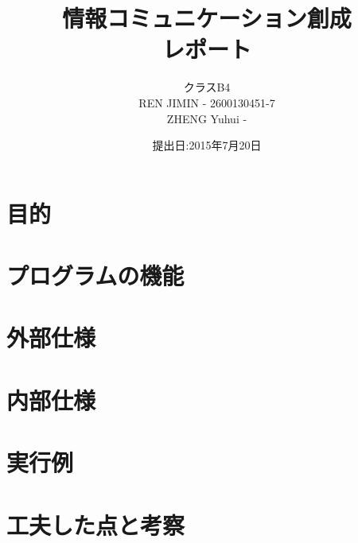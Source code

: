 \documentclass{jarticle}
\title{情報コミュニケーション創成\\レポート}
\author{クラスB4\\REN JIMIN - 2600130451-7\\ZHENG Yuhui - }
\date{提出日:2015年7月20日}
\begin{document}
\maketitle
\tableofcontents
\clearpage

\section{目的}
	
\section{プログラムの機能}
	
\section{外部仕様}
	
\section{内部仕様}
	
\section{実行例}
	
\section{工夫した点と考察}
		
\end{document}
